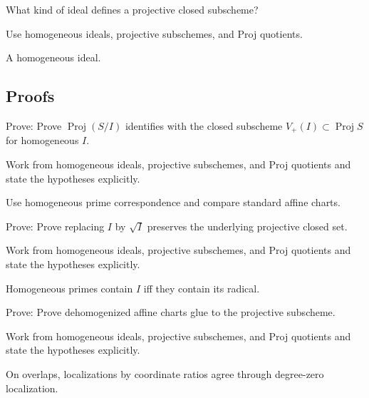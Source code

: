 \begin{exercise}\label{exr:vi37-expand-05}
What kind of ideal defines a projective closed subscheme?
\end{exercise}
\begin{hint}
Use homogeneous ideals, projective subschemes, and Proj quotients.
\end{hint}
\begin{solution}
A homogeneous ideal.
\end{solution}

\subsection*{Proofs}

\begin{exercise}\label{exr:vi37-expand-06}
Prove: Prove $\operatorname{Proj}(S/I)$ identifies with the closed subscheme $V_+(I)\subset\operatorname{Proj}S$ for homogeneous $I$.
\end{exercise}
\begin{hint}
Work from homogeneous ideals, projective subschemes, and Proj quotients and state the hypotheses explicitly.
\end{hint}
\begin{solution}
Use homogeneous prime correspondence and compare standard affine charts.
\end{solution}

\begin{exercise}[Reduction]\label{exr:vi37-expand-07}
Prove: Prove replacing $I$ by $\sqrt I$ preserves the underlying projective closed set.
\end{exercise}
\begin{hint}
Work from homogeneous ideals, projective subschemes, and Proj quotients and state the hypotheses explicitly.
\end{hint}
\begin{solution}
Homogeneous primes contain $I$ iff they contain its radical.
\end{solution}

\begin{exercise}\label{exr:vi37-expand-08}
Prove: Prove dehomogenized affine charts glue to the projective subscheme.
\end{exercise}
\begin{hint}
Work from homogeneous ideals, projective subschemes, and Proj quotients and state the hypotheses explicitly.
\end{hint}
\begin{solution}
On overlaps, localizations by coordinate ratios agree through degree-zero localization.
\end{solution}

